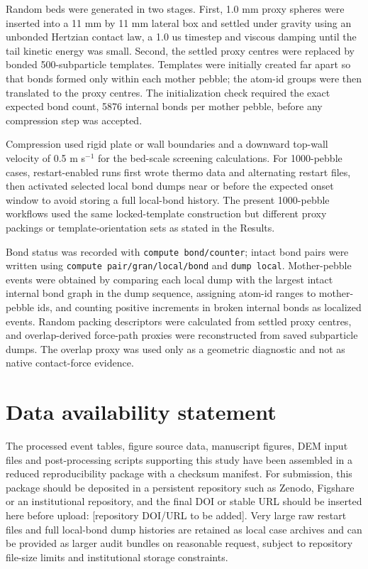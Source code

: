 \documentclass[10pt,twocolumn]{article}
\begin{document}
Random beds were generated in two stages. First, 1.0 mm proxy spheres were inserted into a 11 mm by 11 mm lateral box and settled under gravity using an unbonded Hertzian contact law, a 1.0 us timestep and viscous damping until the tail kinetic energy was small. Second, the settled proxy centres were replaced by bonded 500-subparticle templates. Templates were initially created far apart so that bonds formed only within each mother pebble; the atom-id groups were then translated to the proxy centres. The initialization check required the exact expected bond count, 5876 internal bonds per mother pebble, before any compression step was accepted.


Compression used rigid plate or wall boundaries and a downward top-wall velocity of 0.5 m s$^{-1}$ for the bed-scale screening calculations. For 1000-pebble cases, restart-enabled runs first wrote thermo data and alternating restart files, then activated selected local bond dumps near or before the expected onset window to avoid storing a full local-bond history. The present 1000-pebble workflows used the same locked-template construction but different proxy packings or template-orientation sets as stated in the Results.


Bond status was recorded with \texttt{compute bond/counter}; intact bond pairs were written using \texttt{compute pair/gran/local/bond} and \texttt{dump local}. Mother-pebble events were obtained by comparing each local dump with the largest intact internal bond graph in the dump sequence, assigning atom-id ranges to mother-pebble ids, and counting positive increments in broken internal bonds as localized events. Random packing descriptors were calculated from settled proxy centres, and overlap-derived force-path proxies were reconstructed from saved subparticle dumps. The overlap proxy was used only as a geometric diagnostic and not as native contact-force evidence.


\section{Data availability statement}

The processed event tables, figure source data, manuscript figures, DEM input files and post-processing scripts supporting this study have been assembled in a reduced reproducibility package with a checksum manifest. For submission, this package should be deposited in a persistent repository such as Zenodo, Figshare or an institutional repository, and the final DOI or stable URL should be inserted here before upload: [repository DOI/URL to be added]. Very large raw restart files and full local-bond dump histories are retained as local case archives and can be provided as larger audit bundles on reasonable request, subject to repository file-size limits and institutional storage constraints.
\end{document}
